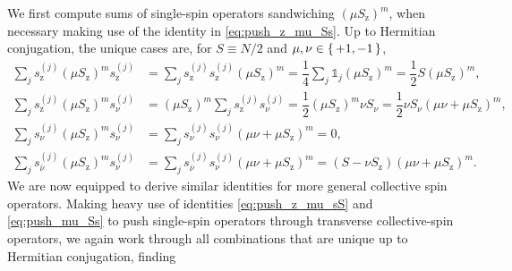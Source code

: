\documentclass[pra,twocolumn,longbibliography]{revtex4-2}
\newcommand{\f}[2]{\dfrac{#1}{#2}} %
\newcommand{\p}[1]{\left( #1 \right)} %
\newcommand{\z}{\text{z}}
\newcommand{\bnu}{{\bar\nu}}
\newcommand{\1}{\mathds{1}}
\begin{document}
We first compute sums of single-spin operators sandwiching
$\p{\mu S_\z}^m$, when necessary making use of the identity in
\eqref{eq:push_z_mu_Ss}.  Up to Hermitian conjugation, the unique
cases are, for $S\equiv N/2$ and $\mu,\nu\in\set{+1,-1}$,
\begin{align}
  \sum_j s_\z^{(j)} \p{\mu S_\z}^m s_\z^{(j)}
  &= \sum_j s_\z^{(j)} s_\z^{(j)} \p{\mu S_\z}^m
  = \f14 \sum_j \1_j \p{\mu S_\z}^m
  = \f12 S \p{\mu S_\z}^m, \\
  \sum_j s_\z^{(j)} \p{\mu S_\z}^m s_\nu^{(j)}
  &= \p{\mu S_\z}^m \sum_j s_\z^{(j)} s_\nu^{(j)}
  = \f12 \p{\mu S_\z}^m \nu S_\nu
  = \f12 \nu S_\nu \p{\mu\nu+\mu S_\z}^m, \\
  \sum_j s_\nu^{(j)} \p{\mu S_\z}^m s_\nu^{(j)}
  &= \sum_j s_\nu^{(j)} s_\nu^{(j)} \p{\mu\nu+\mu S_\z}^m
  = 0, \\
  \sum_j s_\bnu^{(j)} \p{\mu S_\z}^m s_\nu^{(j)}
  &= \sum_j s_\bnu^{(j)} s_\nu^{(j)} \p{\mu\nu+\mu S_\z}^m
  = \p{S-\nu S_\z} \p{\mu\nu+\mu S_\z}^m.
\end{align}
We are now equipped to derive similar identities for more general
collective spin operators.  Making heavy use of identities
\eqref{eq:push_z_mu_sS} and \eqref{eq:push_mu_Ss} to push single-spin
operators through transverse collective-spin operators, we again work
through all combinations that are unique up to Hermitian conjugation,
finding
\end{document}
